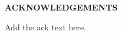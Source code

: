 \thispagestyle{plain}
\begin{center}
\textbf{\textbf{\fontsize{16pt}{24pt}\selectfont ACKNOWLEDGEMENTS}}
\end{center}

Add the ack text here.

\newpage

